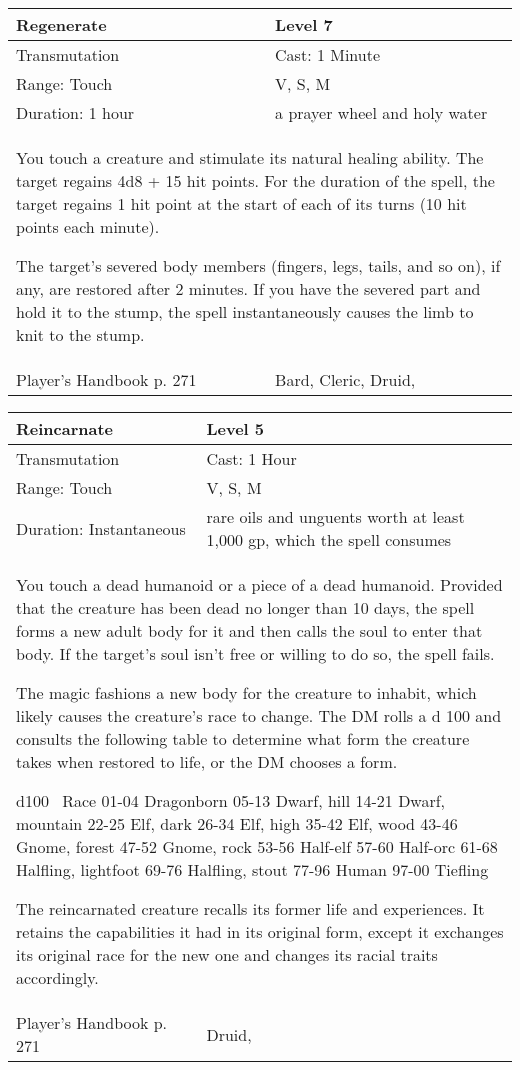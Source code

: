 \documentclass[11pt]{report}
\begin{document}
\begin{table}[H]
	\begin{tabular}{||p{6cm}|p{6cm}||}
		\hline\hline
		\bf{Regenerate} & Level 7\\ \hline
		Transmutation & Cast: 1 Minute\\ \hline
		Range: Touch & V, S, M\\ \hline
		Duration: 1 hour & a prayer wheel and holy water\\ \hline
		\multicolumn{2}{||p{12cm}||}{You touch a creature and stimulate its natural healing ability.
The target regains 4d8 + 15 hit points. For the duration of the spell, the target regains 1 hit point at the start of each of its turns (10 hit points each minute).

The target’s severed body members (fingers, legs, tails, and so on), if any, are restored after 2 minutes. If you have the severed part and hold it to the stump, the spell instantaneously causes the limb to knit to the stump.}\\ \hline
Player's Handbook p. 271 & Bard, Cleric, Druid, \\ \hline\hline
	\end{tabular}
\end{table}

\begin{table}[H]
	\begin{tabular}{||p{6cm}|p{6cm}||}
		\hline\hline
		\bf{Reincarnate} & Level 5\\ \hline
		Transmutation & Cast: 1 Hour\\ \hline
		Range: Touch & V, S, M\\ \hline
		Duration: Instantaneous & rare oils and unguents worth at least 1,000 gp, which the spell consumes\\ \hline
		\multicolumn{2}{||p{12cm}||}{You touch a dead humanoid or a piece of a dead humanoid. Provided that the creature has been dead no longer than 10 days, the spell forms a new adult body for it and then calls the soul to enter that body. If the target’s soul isn’t free or willing to do so, the spell fails.

The magic fashions a new body for the creature to inhabit, which likely causes the creature’s race to change. The DM rolls a d 100 and consults the following table to determine what form the creature takes when restored to life, or the DM chooses a form.

d100  Race
01-04 Dragonborn
05-13 Dwarf, hill
14-21 Dwarf, mountain
22-25 Elf, dark
26-34 Elf, high
35-42 Elf, wood
43-46 Gnome, forest
47-52 Gnome, rock
53-56  Half-elf
57-60 Half-orc
61-68 Halfling, lightfoot
69-76 Halfling, stout
77-96 Human
97-00 Tiefling

The reincarnated creature recalls its former life and experiences. It retains the capabilities it had in its original form, except it exchanges its original race for the new one and changes its racial traits accordingly.}\\ \hline
Player's Handbook p. 271 & Druid, \\ \hline\hline
	\end{tabular}
\end{table}
\end{document}
